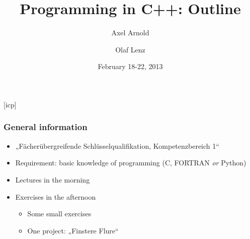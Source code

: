 \documentclass{slides}
\begin{document}
\graphicspath{{figures/}}

\title[Programming in C++: Outline]{\Large Programming in C++: Outline}

\author[A. Arnold and O. Lenz]{Axel Arnold \and Olaf Lenz} 
\date{February 18-22, 2013}

\begin{frame}
  \titlepage
\end {frame}
[icp]

\begin{frame}
  \frametitle{General information}
  \begin{itemize}
  \item „Fächerübergreifende Schlüsselqualifikation, Kompetenzbereich 1“
  \item Requirement: basic knowledge of programming (C, FORTRAN \emph{or} Python)
  \item Lectures in the morning
  \item Exercises in the afternoon
    \begin{itemize}
    \item Some small exercises
    \item One project: „Finstere Flure“
    \end{itemize}
  \end{itemize}
\end{frame}
\end{document}
